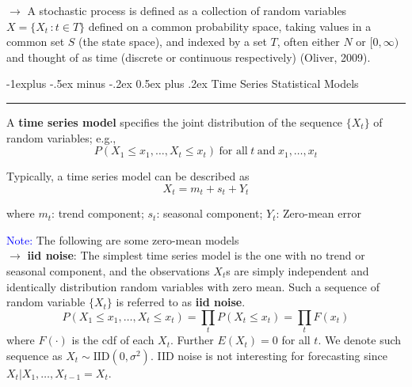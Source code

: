 \documentclass[letterpaper, 10.5pt,landscape]{article}
\makeatletter
\renewcommand{\subsection}{\@startsection{subsection}{2}{0mm}%
                                {-1explus -.5ex minus -.2ex}%
                                {0.5ex plus .2ex}%
                                {\normalfont\normalsize\bfseries}}
\makeatother
\begin{document}
\begin{multicols*}{3}
\vspace{5pt}
$\rightarrow$ A stochastic process is defined as a collection of random variables $X=\{X_{t} \hspace{2pt}: t \in T\}$ defined on a common probability space, taking values in a common set $S$ (the state space), and indexed by a set $T$, often either $N$ or $[0, \infty)$ and thought of as time (discrete or continuous respectively) (Oliver, 2009).



\subsection{Time Series Statistical Models} {\color{teal}\hrule height 0.5pt} \smallskip

A \textbf{time series model} specifies the joint distribution of the sequence $\{X_{t} \}$ of random variables; e.g., 
\vspace{-3pt}
\[P\left(X_{1} \leq x_{1}, \ldots, X_{t} \leq x_{t}\right) \hspace{3pt} \text{for all} \hspace{3pt} t \hspace{3pt} \text{and} \hspace{3pt} x_{1},\ldots, x_{t} \]

Typically, a time series model can be described as 
\vspace{-3pt}
\[X_{t} = m_{t} + s_{t} + Y_{t} \]

where $m_{t}$: trend component; $s_{t}$: seasonal component; $Y_{t}$: Zero-mean error 

\vspace{3pt}
\textcolor{blue}{Note:} The following are some zero-mean models \\

$\rightarrow$ \textbf{iid noise}: The simplest time series model is the one with no trend or seasonal component, and the observations $X_{t}$s are simply independent and identically distribution random variables with zero mean. Such a sequence of random variable $\{X_{t}\}$ is referred to as \textbf{iid noise}.
\vspace{-3pt}
\[P\left(X_{1} \leq x_{1}, \ldots, X_{t} \leq x_{t} \right) = \prod_{t} P \left(X_{t} \leq x_{t}\right) = \prod_{t} F(x_{t})\] where $F(\cdot)$ is the cdf of each $X_{t}$. Further $E(X_{t}) = 0$ for all $t$. We denote such sequence as $X_{t} \sim \text{IID}(0, \sigma^{2})$. IID noise is not interesting for forecasting since $X_{t}|X_{1}, \ldots, X_{t-1} = X_{t}$. \\


\end{multicols*}
\end{document}
